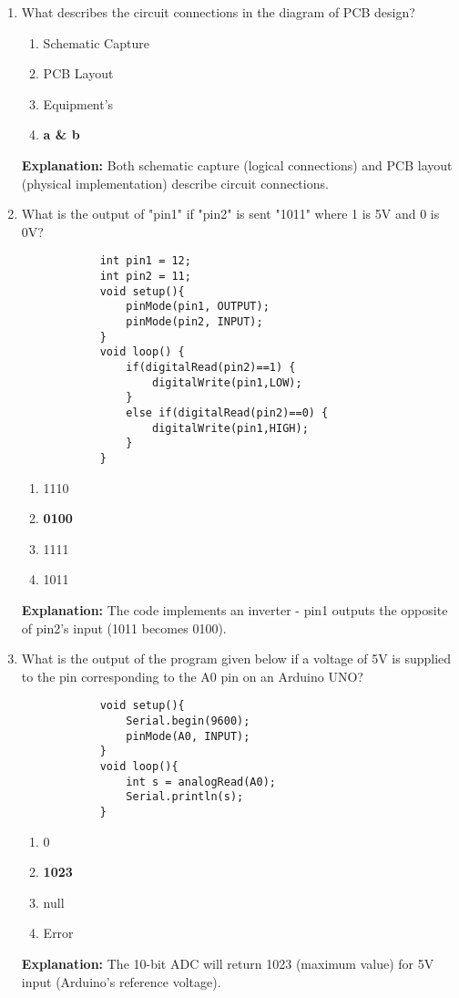 \documentclass[a4paper,12pt]{article}
\begin{document}
\begin{enumerate}
		\item What describes the circuit connections in the diagram of PCB design?
		\begin{enumerate}
			\item Schematic Capture
			\item PCB Layout
			\item Equipment's
			\item \textbf{a \& b}
		\end{enumerate}
		\textbf{Explanation:} Both schematic capture (logical connections) and PCB layout (physical implementation) describe circuit connections.
		
		\item What is the output of "pin1" if "pin2" is sent "1011" where 1 is 5V and 0 is 0V?
		\begin{verbatim}
			int pin1 = 12;
			int pin2 = 11;
			void setup(){
				pinMode(pin1, OUTPUT);
				pinMode(pin2, INPUT);
			}
			void loop() {
				if(digitalRead(pin2)==1) {
					digitalWrite(pin1,LOW);
				}
				else if(digitalRead(pin2)==0) {
					digitalWrite(pin1,HIGH);
				}
			}
		\end{verbatim}
		\begin{enumerate}
			\item 1110
			\item \textbf{0100}
			\item 1111
			\item 1011
		\end{enumerate}
		\textbf{Explanation:} The code implements an inverter - pin1 outputs the opposite of pin2's input (1011 becomes 0100).
		
		\item What is the output of the program given below if a voltage of 5V is supplied to the pin corresponding to the A0 pin on an Arduino UNO?
		\begin{verbatim}
			void setup(){
				Serial.begin(9600);
				pinMode(A0, INPUT);
			}
			void loop(){
				int s = analogRead(A0);
				Serial.println(s);
			}
		\end{verbatim}
		\begin{enumerate}
			\item 0
			\item \textbf{1023}
			\item null
			\item Error
		\end{enumerate}
		\textbf{Explanation:} The 10-bit ADC will return 1023 (maximum value) for 5V input (Arduino's reference voltage).
		

\end{enumerate}
\end{document}
